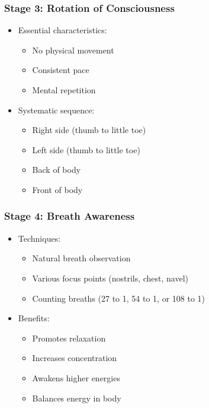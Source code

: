 \begin{frame}[fragile]\frametitle{Stage 3: Rotation of Consciousness}
    \begin{itemize}
        \item Essential characteristics:
            \begin{itemize}
                \item No physical movement
                \item Consistent pace
                \item Mental repetition
            \end{itemize}
        \item Systematic sequence:
            \begin{itemize}
                \item Right side (thumb to little toe)
                \item Left side (thumb to little toe)
                \item Back of body
                \item Front of body
            \end{itemize}
    \end{itemize}
\end{frame}

\begin{frame}[fragile]\frametitle{Stage 4: Breath Awareness}
    \begin{itemize}
        \item Techniques:
            \begin{itemize}
                \item Natural breath observation
                \item Various focus points (nostrils, chest, navel)
                \item Counting breaths (27 to 1, 54 to 1, or 108 to 1)
            \end{itemize}
        \item Benefits:
            \begin{itemize}
                \item Promotes relaxation
                \item Increases concentration
                \item Awakens higher energies
                \item Balances energy in body
            \end{itemize}
    \end{itemize}
\end{frame}

